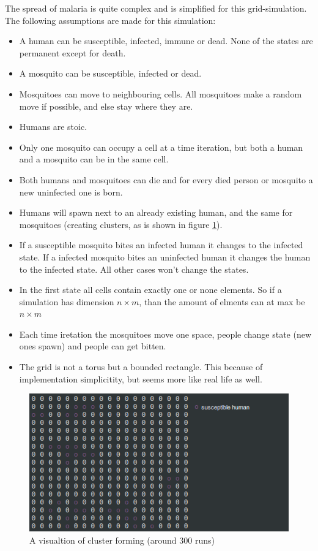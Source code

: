 \documentclass[a4paper]{report}
\begin{document}
The spread of malaria is quite complex and is simplified for this
grid-simulation. The following assumptions are made for this simulation:

\begin{itemize}
    \item A human can be susceptible, infected, immune or dead. None of the states are
        permanent except for death.
    \item A mosquito can be susceptible, infected or dead. 
    \item Mosquitoes can move to neighbouring cells. All mosquitoes make a
        random move if possible, and else stay where they are.
    \item Humans are stoic.
    \item Only one mosquito can occupy a cell at a time iteration, but both a
        human and a mosquito can be in the same cell.
    \item Both humans and mosquitoes can die and for every died person or
        mosquito a new uninfected one is born.
    \item Humans will spawn next to an already existing human, and the same for
        mosquitoes (creating clusters, as is shown in figure \ref{fig:clustering}).
    \item If a susceptible mosquito bites an infected human it changes to the
        infected state. If a infected mosquito bites an uninfected human it
        changes the human to the infected state. All other cases won't change
        the states.
    \item In the first state all cells contain exactly one or none elements. So
    if a simulation has dimension $n \times m$, than the amount of elments can
    at max be $n \times m$
    \item Each time iretation the mosquitoes move one space, people change state
        (new ones spawn)
        and people can get bitten.
    \item The grid is not a torus but a bounded rectangle. This because of
        implementation simplicitity, but seems more like real life as well.
\end{itemize}


\begin{figure}[htbp]
    \centering
    \includegraphics[width=1\textwidth]{population_clusters.png}
    \caption{A visualtion of cluster forming (around 300 runs)}
    \label{fig:clustering}
\end{figure}
\end{document}
